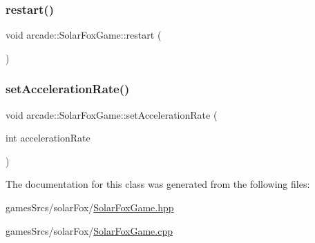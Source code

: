 \mbox{\label{classarcade_1_1_solar_fox_game_a60c1aad9687dea93c752717672ae31fc}} 
\subsubsection{\texorpdfstring{restart()}{restart()}}
{\footnotesize\ttfamily void arcade\+::\+Solar\+Fox\+Game\+::restart (\begin{DoxyParamCaption}{ }\end{DoxyParamCaption})}

\mbox{\label{classarcade_1_1_solar_fox_game_a6e846bc8d6fbd3752c5342bfb682e9cb}} 
\subsubsection{\texorpdfstring{set\+Acceleration\+Rate()}{setAccelerationRate()}}
{\footnotesize\ttfamily void arcade\+::\+Solar\+Fox\+Game\+::set\+Acceleration\+Rate (\begin{DoxyParamCaption}\item[{int}]{acceleration\+Rate }\end{DoxyParamCaption})}



The documentation for this class was generated from the following files\+:\begin{DoxyCompactItemize}
\item 
games\+Srcs/solar\+Fox/\hyperlink{_solar_fox_game_8hpp}{Solar\+Fox\+Game.\+hpp}\item 
games\+Srcs/solar\+Fox/\hyperlink{_solar_fox_game_8cpp}{Solar\+Fox\+Game.\+cpp}\end{DoxyCompactItemize}
